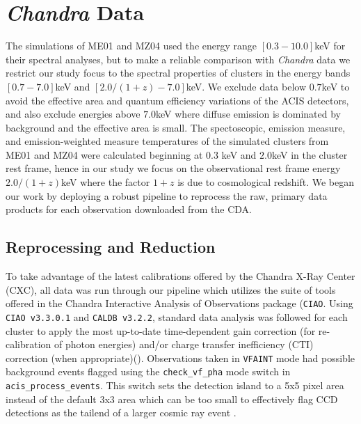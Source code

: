 \documentclass[12pt, preprint]{aastex}
\begin{document}
\section{\textit{Chandra} Data}\label{sec:data}


The simulations of ME01 and MZ04 used the energy range $[0.3-10.0]$keV
for their spectral analyses, but to make a reliable comparison with
{\textit{Chandra}} data we restrict our study focus to the spectral properties of
clusters in the energy bands $[0.7-7.0]$keV and
$[2.0/(1+z)-7.0]$keV. We exclude data below $0.7$keV to avoid the
effective area and quantum efficiency variations of the ACIS detectors, and
also exclude energies above $7.0$keV where diffuse emission is
dominated by background and the effective area is small. The spectoscopic, emission measure, and
emission-weighted measure temperatures of the simulated
clusters from ME01 and MZ04 were calculated beginning at $0.3$ keV and
$2.0$keV in the cluster rest frame, hence in our study we focus on the observational
rest frame energy $2.0/(1+z)$keV where the factor $1+z$ is due
to cosmological redshift. We began our work by deploying a robust
pipeline to reprocess the raw, primary data products for each
observation downloaded from the CDA.

\subsection{Reprocessing and Reduction}\label{sec:reprocessing}


To take advantage of the latest calibrations offered by the Chandra
X-Ray Center (CXC), all data was run through our pipeline which
utilizes the suite of tools offered in the Chandra Interactive
Analysis of Observations package ({\tt CIAO}. Using {\tt CIAO
v3.3.0.1} and {\tt CALDB v3.2.2}, standard data
analysis was followed for each cluster to apply the most up-to-date
time-dependent gain correction (for re-calibration of photon energies)
and/or charge transfer inefficiency (CTI) correction (when
appropriate)(\cite{2000ApJ...534L.139T}). Observations taken in {\tt VFAINT}
mode had possible background events flagged using the {\tt check\_vf\_pha}
mode switch in {\tt acis\_process\_events}. This switch sets the detection
island to a 5x5 pixel area instead of the default 3x3 area which can
be too small to effectively flag CCD detections as the tailend
of a larger cosmic ray event .
\end{document}
